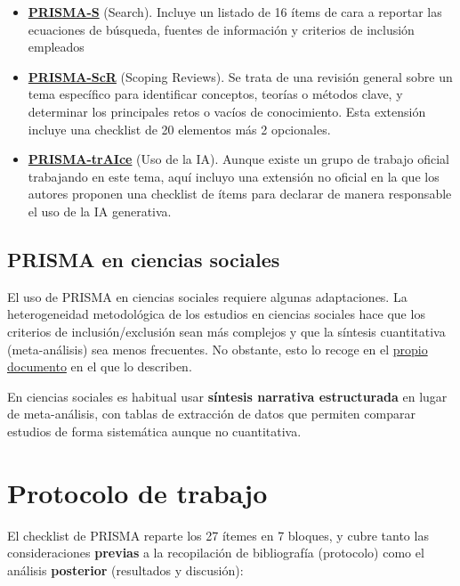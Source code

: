 \documentclass[
]{book}
\begin{document}
\begin{itemize}
\item
  \href{materiales/PRISMA-S\%20Checklist.pdf}{\textbf{PRISMA-S}} (Search). Incluye un listado de 16 ítems de cara a reportar las ecuaciones de búsqueda, fuentes de información y criterios de inclusión empleados
\item
  \href{materiales/PRISMA_ScR_Manuscript_July6th_clean_1_.pdf}{\textbf{PRISMA-ScR}} (Scoping Reviews). Se trata de una revisión general sobre un tema específico para identificar conceptos, teorías o métodos clave, y determinar los principales retos o vacíos de conocimiento. Esta extensión incluye una checklist de 20 elementos más 2 opcionales.
\item
  \href{materiales/ai-2025-1-e80247.pdf}{\textbf{PRISMA-trAIce}} (Uso de la IA). Aunque existe un grupo de trabajo oficial trabajando en este tema, aquí incluyo una extensión no oficial en la que los autores proponen una checklist de ítems para declarar de manera responsable el uso de la IA generativa.
\end{itemize}

\subsection{PRISMA en ciencias sociales}\label{prisma-en-ciencias-sociales}

El uso de PRISMA en ciencias sociales requiere algunas adaptaciones. La heterogeneidad metodológica de los estudios en ciencias sociales hace que los criterios de inclusión/exclusión sean más complejos y que la síntesis cuantitativa (meta-análisis) sea menos frecuentes. No obstante, esto lo recoge en el \href{http://dx.doi.org/10.1136/bmj.n71}{propio documento} en el que lo describen.

En ciencias sociales es habitual usar \textbf{síntesis narrativa estructurada} en lugar de meta-análisis, con tablas de extracción de datos que permiten comparar estudios de forma sistemática aunque no cuantitativa.

\section{Protocolo de trabajo}\label{protocolo-de-trabajo}

El checklist de PRISMA reparte los 27 ítemes en 7 bloques, y cubre tanto las consideraciones \textbf{previas} a la recopilación de bibliografía (protocolo) como el análisis \textbf{posterior} (resultados y discusión):
\end{document}
